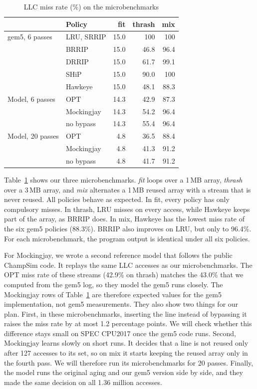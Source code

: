 \documentclass[10pt,journal,compsoc]{IEEEtran}
\begin{document}
\begin{table}[t]
\centering
\caption{LLC miss rate (\%) on the microbenchmarks}
\label{tab:micro}
\setlength{\tabcolsep}{5pt}
\begin{tabular}{@{}llrrr@{}}
\toprule
& Policy & fit & thrash & mix \\
\midrule
gem5, 6 passes & LRU, SRRIP & 15.0 & 100 & 100 \\
& BRRIP & 15.0 & 46.8 & 96.4 \\
& DRRIP & 15.0 & 61.7 & 99.1 \\
& SHiP & 15.0 & 90.0 & 100 \\
& Hawkeye & 15.0 & 48.1 & 88.3 \\
\midrule
Model, 6 passes & OPT & 14.3 & 42.9 & 87.3 \\
& Mockingjay & 14.3 & 54.2 & 96.4 \\
& \quad no bypass & 14.3 & 55.4 & 96.4 \\
\midrule
Model, 20 passes & OPT & 4.8 & 36.5 & 88.4 \\
& Mockingjay & 4.8 & 41.3 & 91.2 \\
& \quad no bypass & 4.8 & 41.7 & 91.2 \\
\bottomrule
\end{tabular}
\end{table}

Table~\ref{tab:micro} shows our three microbenchmarks. \emph{fit} loops over a
1\,MB array, \emph{thrash} over a 3\,MB array, and \emph{mix} alternates a
1\,MB reused array with a stream that is never reused. All policies behave as
expected. In fit, every policy has only compulsory misses. In thrash, LRU
misses on every access, while Hawkeye keeps part of the array, as BRRIP does.
In mix, Hawkeye has the lowest miss rate of the six gem5 policies (88.3\%).
BRRIP also improves on LRU, but only to 96.4\%. For each
microbenchmark, the program output is identical under all six policies.

For Mockingjay, we wrote a second reference model that follows the public
ChampSim code. It replays the same LLC accesses as our microbenchmarks. The OPT miss rate
of these streams (42.9\% on thrash) matches the 43.0\% that we computed from
the gem5 log, so they model the gem5 runs closely. The Mockingjay rows of
Table~\ref{tab:micro} are therefore expected values for the gem5
implementation, not gem5 measurements. They also show two things for our plan.
First, in these microbenchmarks, inserting the line instead of bypassing it
raises the miss rate by at most 1.2 percentage points. We will check whether
this difference stays small on SPEC CPU2017 once the gem5 code runs. Second,
Mockingjay learns slowly on short runs. It decides that a line is not reused
only after 127 accesses to its set, so on mix it starts keeping the reused array only
in the fourth pass. We will therefore run its microbenchmarks for 20 passes.
Finally, the model runs the original aging and our gem5 version side by side,
and they made the same decision on all 1.36 million accesses.
\end{document}

